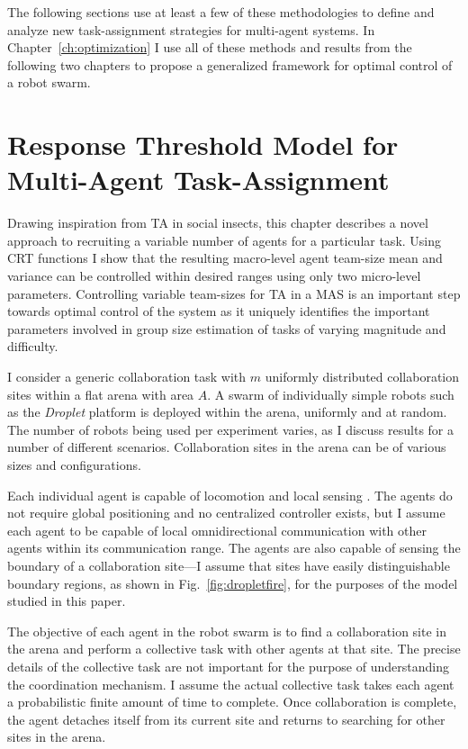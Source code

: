 \documentclass[defaultstyle,12pt]{proposal}
\begin{document}
The following sections use at least a few of these methodologies to define and analyze new task-assignment strategies for multi-agent systems. In Chapter~\ref{ch:optimization} I use all of these methods and results from the following two chapters to propose a generalized framework for optimal control of a robot swarm.


\chapter{Response Threshold Model for Multi-Agent Task-Assignment}\label{ch:resthmodel}
Drawing inspiration from TA in social insects, this chapter describes a novel approach to recruiting a variable number of agents for a particular task. Using CRT functions I show that the resulting macro-level agent team-size mean and variance can be controlled within desired ranges using only two micro-level parameters. Controlling variable team-sizes for TA in a MAS is an important step towards optimal control of the system as it uniquely identifies the important parameters involved in group size estimation of tasks of varying magnitude and difficulty. 

I consider a generic collaboration task with $m$ uniformly distributed collaboration sites within a flat arena with area $A$. A swarm of individually simple robots such as the \emph{Droplet} platform \cite{Farrow2014,Klingner2014} is deployed within the arena, uniformly and at random. The number of robots being used per experiment varies, as I discuss results for a number of different scenarios. Collaboration sites in the arena can be of various sizes and configurations.

Each individual agent is capable of locomotion \cite{Klingner2014} and local sensing \cite{Farrow2014}. The agents do not require global positioning and no centralized controller exists, but I assume each agent to be capable of local omnidirectional communication with other agents within its communication range. The agents are also capable of sensing the boundary of a collaboration site---I assume that sites have easily distinguishable boundary regions, as shown in Fig.~\ref{fig:dropletfire}, for the purposes of the model studied in this paper. 

The objective of each agent in the robot swarm is to find a collaboration site in the arena and perform a collective task with other agents at that site. The precise details of the collective task are not important for the purpose of understanding the coordination mechanism. I assume the actual collective task takes each agent a probabilistic finite amount of time to complete. Once collaboration is complete, the agent detaches itself from its current site and returns to searching for other sites in the arena. 
\end{document}
